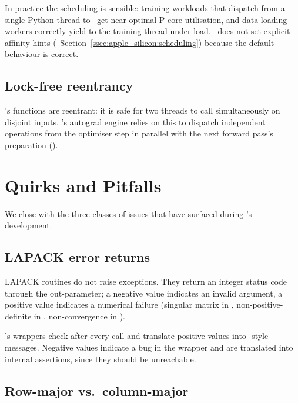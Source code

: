 In practice the scheduling is sensible: training workloads that
dispatch from a single Python thread to \Accelerate\ get
near-optimal P-core utilisation, and data-loading workers correctly
yield to the training thread under load. \Lucid\ does not set
explicit affinity hints
(~Section~\ref{ssec:apple_silicon:scheduling})
because the default behaviour is correct.

\subsection{Lock-free reentrancy}
\label{ssec:accelerate:reentrancy}

\Accelerate's functions are reentrant: it is safe for two threads to
call  simultaneously on disjoint inputs.
\Lucid's autograd engine relies on this to dispatch independent
operations from the optimiser step in parallel with the next
forward pass's preparation ().

\section{Quirks and Pitfalls}
\label{sec:accelerate:quirks}

We close with the three classes of issues that have surfaced during
\Lucid's development.

\subsection{LAPACK error returns}
\label{ssec:accelerate:lapack_errors}

LAPACK routines do not raise exceptions. They return an integer
status code through the  out-parameter; a negative value
indicates an invalid argument, a positive value indicates a numerical
failure (singular matrix in , non-positive-definite in
, non-convergence in ).

\Lucid's wrappers check  after every call and translate
positive values into -style messages. Negative 
values indicate a bug in the wrapper and are translated into
internal assertions, since they should be unreachable.

\subsection{Row-major vs.\ column-major}
\label{ssec:accelerate:row_col}

